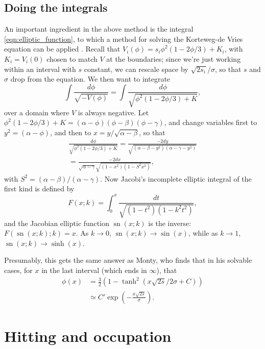 \documentclass{article}
\DeclareMathOperator{\sn}{sn}
\begin{document}
\subsection{Doing the integrals}
\label{apx:some_integrals}

An important ingredient in the above method is the integral \eqref{eqn:elliptic_function},
to which a method for solving the Korteweg-de Vries equation can be applied \citep{NEQwiki}.
Recall that $V_i(\phi) =  s_i \phi^2(1-2\phi/3) + K_i$, with $K_i = V_i(0)$ chosen to match $V$ at the boundaries;
since we're just working within an interval with $s$ constant, we can rescale space by $\sqrt{2 s_i}/\sigma$,
so that $s$ and $\sigma$ drop from the equation.
We then want to integrate
\[
    \int \frac{ d\phi }{ \sqrt{-V(\phi)} } = 
         \int \frac{ d\phi }{ \sqrt{ \phi^2 (1-2\phi/3) + K } } ,
\]
over a domain where $V$ is always negative.
Let $\phi^2(1-2\phi/3)+K = (\alpha-\phi)(\phi-\beta)(\phi-\gamma)$,
and change variables first to $y^2=(\alpha-\phi)$, 
and then to $x = y/\sqrt{\alpha-\beta}$, so that
\begin{align*}
    \frac{ d\phi }{ \sqrt{ \phi^2 (1-2\phi/3) + K } } 
        = \frac{ - 2 dy }{ \sqrt{ (\alpha-\beta-y^2) (\alpha-\gamma-y^2) } } \\
        = \frac{ - 2 dx }{ \sqrt{\alpha-\gamma} \sqrt{ (1-x^2) (1-S^2 x^2) } } ,
\end{align*}
with $S^2 = (\alpha-\beta)/(\alpha-\gamma)$.
Now Jacobi's incomplete elliptic integral of the first kind is defined by
\[
    F(x;k) = \int_0^x \frac{dt}{\sqrt{ (1-t^2)(1-k^2t^2) }} ,
\]
and the Jacobian elliptic function $\sn(x;k)$ is the inverse: $F(\sn(x;k);k) = x$.
As $k \to 0$, $\sn(x;k) \to \sin(x)$, while as $k \to 1$, $\sn(x;k) \to \sinh(x)$.

Presumably, this gets the same answer as Monty, who finds that in his solvable cases,
for $x$ in the last interval (which ends in $\infty$), that
\begin{align*}
    \phi(x) &= \frac{3}{2}\left( 1 - \tanh^2 ( x \sqrt{2s} / 2 \sigma + C ) \right) \\
        &\simeq C' \exp\left( - \frac{ x \sqrt{2s} }{ \sigma } \right) .
\end{align*}



\section{Hitting and occupation}
\label{apx:hitting_occupation}
\end{document}
